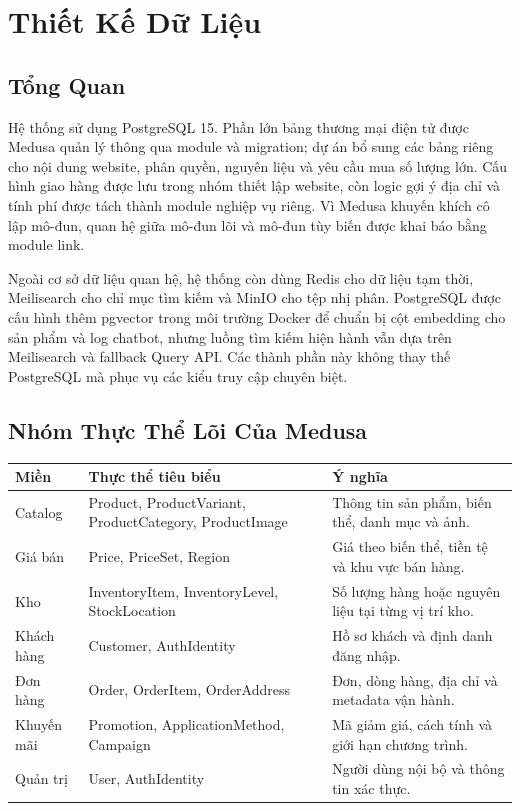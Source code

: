 \chapter{Thiết Kế Dữ Liệu}

\section{Tổng Quan}

Hệ thống sử dụng PostgreSQL 15. Phần lớn bảng thương mại điện tử được Medusa quản lý thông qua module và migration; dự án bổ sung các bảng riêng cho nội dung website, phân quyền, nguyên liệu và yêu cầu mua số lượng lớn. Cấu hình giao hàng được lưu trong nhóm thiết lập website, còn logic gợi ý địa chỉ và tính phí được tách thành module nghiệp vụ riêng. Vì Medusa khuyến khích cô lập mô-đun, quan hệ giữa mô-đun lõi và mô-đun tùy biến được khai báo bằng module link.

Ngoài cơ sở dữ liệu quan hệ, hệ thống còn dùng Redis cho dữ liệu tạm thời, Meilisearch cho chỉ mục tìm kiếm và MinIO cho tệp nhị phân. PostgreSQL được cấu hình thêm pgvector trong môi trường Docker để chuẩn bị cột embedding cho sản phẩm và log chatbot, nhưng luồng tìm kiếm hiện hành vẫn dựa trên Meilisearch và fallback Query API. Các thành phần này không thay thế PostgreSQL mà phục vụ các kiểu truy cập chuyên biệt.

\section{Nhóm Thực Thể Lõi Của Medusa}

\begin{longtable}{@{}L{0.22\textwidth} L{0.28\textwidth} L{0.42\textwidth}@{}}
  \toprule
  \textbf{Miền} & \textbf{Thực thể tiêu biểu} & \textbf{Ý nghĩa} \\
  \midrule
  \endhead
  Catalog & Product, ProductVariant, ProductCategory, ProductImage & Thông tin sản phẩm, biến thể, danh mục và ảnh. \\
  Giá bán & Price, PriceSet, Region & Giá theo biến thể, tiền tệ và khu vực bán hàng. \\
  Kho & InventoryItem, InventoryLevel, StockLocation & Số lượng hàng hoặc nguyên liệu tại từng vị trí kho. \\
  Khách hàng & Customer, AuthIdentity & Hồ sơ khách và định danh đăng nhập. \\
  Đơn hàng & Order, OrderItem, OrderAddress & Đơn, dòng hàng, địa chỉ và metadata vận hành. \\
  Khuyến mãi & Promotion, ApplicationMethod, Campaign & Mã giảm giá, cách tính và giới hạn chương trình. \\
  Quản trị & User, AuthIdentity & Người dùng nội bộ và thông tin xác thực. \\
  \bottomrule
\end{longtable}

